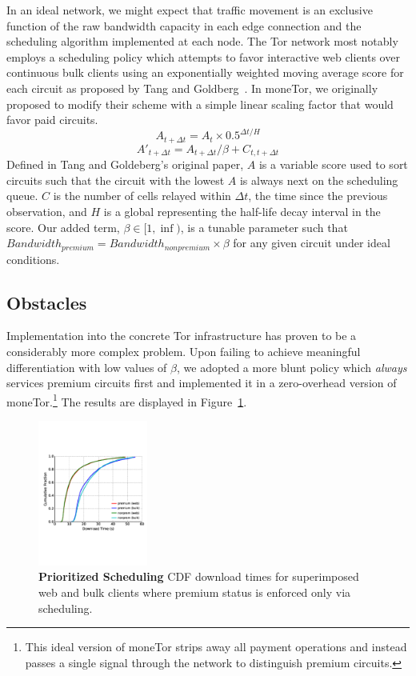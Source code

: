 In an ideal network, we might expect that traffic movement is an exclusive
function of the raw bandwidth capacity in each edge connection and the
scheduling algorithm implemented at each node. The Tor network most notably
employs a scheduling policy which attempts to favor interactive web clients over
continuous bulk clients using an exponentially weighted moving average score for
each circuit as proposed by Tang and Goldberg~\cite{tang2010improved}. In
moneTor, we originally proposed to modify their scheme with a simple linear
scaling factor that would favor paid circuits.
\begin{equation}
  A_{t + \Delta t} = A_t \times 0.5^{\Delta t/H}
\end{equation}
\begin{equation}
  A'_{t + \Delta t} = A_{t + \Delta t} / \beta + C_{t, t + \Delta t}
\end{equation}
Defined in Tang and Goldeberg's original paper, $A$ is a variable score used to
sort circuits such that the circuit with the lowest $A$ is always next on the
scheduling queue. $C$ is the number of cells relayed within $\Delta t$, the time
since the previous observation, and $H$ is a global representing the half-life
decay interval in the score. Our added term, $\beta \in [1, \inf)$, is a tunable
parameter such that $Bandwidth_{premium} = Bandwidth_{nonpremium} \times \beta$
for any given circuit under ideal conditions.

\subsection{Obstacles}

Implementation into the concrete Tor infrastructure has proven to be a
considerably more complex problem. Upon failing to achieve meaningful
differentiation with low values of $\beta$, we adopted a more blunt policy which
\emph{always} services premium circuits first and implemented it in a
zero-overhead version of moneTor.\footnote{This ideal version of moneTor strips
  away all payment operations and instead passes a single signal through the
  network to distinguish premium circuits.} The results are displayed in
Figure~\ref{fig:scheduling_priority}.

\begin{figure} \centering
  \includegraphics[trim={0 3cm 0 3cm}, clip, width=0.32\textwidth]{images/scheduling_priority.pdf}
  \caption[Prioritized Scheduling]{\textbf{Prioritized Scheduling} CDF download
    times for superimposed web and bulk clients where premium status is enforced
    only via scheduling.}
  \label{fig:scheduling_priority}
\end{figure}

